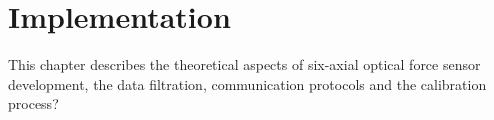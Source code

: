 \chapter{Implementation}
\label{chapter:implementation}

This chapter describes the theoretical aspects of six-axial optical force sensor development, the data filtration, communication protocols and the calibration process?













